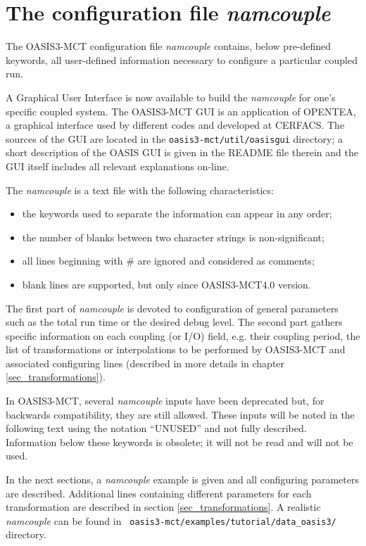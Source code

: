 \newpage
\chapter{The configuration file {\it namcouple}}
\label{sec_namcouple}

The OASIS3-MCT configuration file {\it namcouple} contains, below
pre-defined keywords, all user-defined information necessary to
configure a particular coupled run.

A Graphical User Interface is now available to build
the {\it namcouple} for one's specific coupled
system. The OASIS3-MCT GUI is an application of OPENTEA, a graphical
interface used by different codes and developed at CERFACS. The
sources of the GUI are located in the {\tt oasis3-mct/util/oasisgui}
directory; a short description of the OASIS GUI is given in the README
file therein and the GUI itself includes all relevant explanations
on-line.

The {\it namcouple} is a text file with the following characteristics:

\begin{itemize}
\item the keywords used to separate the information can appear in any
  order;
\item the number of blanks between two character strings is
  non-significant;
\item all lines beginning with \# are ignored and considered as
  comments;
\item blank lines are supported, but only since OASIS3-MCT4.0 version.
\end{itemize}

The first part of {\it namcouple } is devoted to configuration of
general parameters such as the total run time or the desired debug level.  
The second part gathers specific
information on each coupling (or I/O) field, e.g. their coupling
period, the list of transformations or interpolations to be performed
by OASIS3-MCT and associated configuring lines (described in more
details in chapter \ref{sec_transformations}).

In OASIS3-MCT, several {\it namcouple} inputs have been deprecated
but, for backwards compatibility, they are still allowed.  These
inputs will be noted in the following text using the notation
``UNUSED'' and not fully described. Information below these keywords
is obsolete; it will not be read and will not be used.

In the next sections, a {\it namcouple} example is given and
all configuring parameters are described. Additional lines
containing different parameters for each transformation
are described in section \ref{sec_transformations}. A realistic {\it
  namcouple} can be found in {\tt
  oasis3-mct/examples/tutorial/data\_oasis3/} directory.

